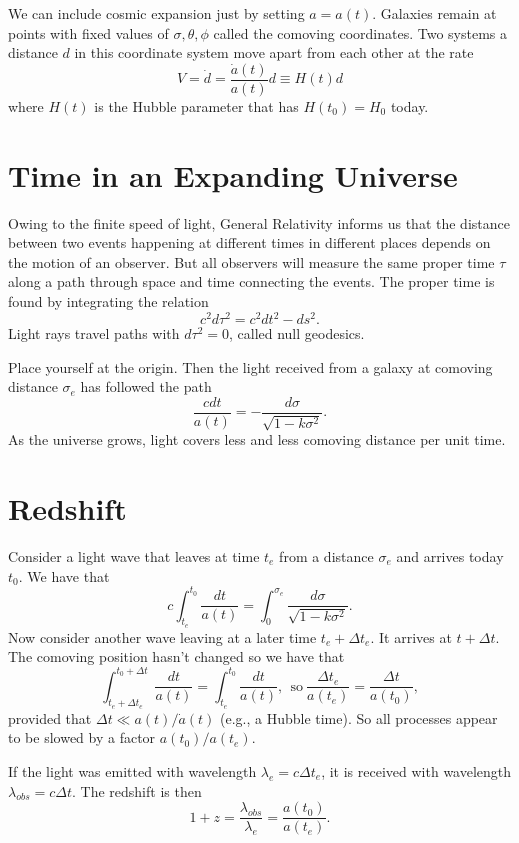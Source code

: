\documentclass[]{article}
\begin{document}
We can include cosmic expansion just by setting $a = a(t)$. Galaxies
remain at points with fixed values of $\sigma, \theta, \phi$ called
the comoving coordinates.  Two systems a distance $d$ in this coordinate system
move apart from each other at the rate
\begin{equation}
V = \dot{d} = \frac{\dot{a}(t)}{a(t)}d \equiv H(t) d
\end{equation}
\noindent
where $H(t)$ is the Hubble parameter that has $H(t_0) = H_0$
today.

\section{Time in an Expanding Universe}
Owing to the finite speed of light, General Relativity
informs us that the distance between two events happening
at different times in different places depends on  the
motion of an observer.  But all observers will measure
the same proper time $\tau$ along a path through space
and time connecting the events.  The proper time
is found by integrating the relation
\begin{equation}
c^2 d\tau^2 = c^2 dt^2 - ds^2.
\end{equation}
\noindent
Light rays travel paths with $d\tau^2 = 0$, called
null geodesics.

Place yourself at the origin.  Then the light
received from a galaxy at comoving distance
$\sigma_e$ has followed the path
\begin{equation}
\frac{c dt}{a(t)} = -\frac{d\sigma}{\sqrt{1-k\sigma^2}}.
\end{equation}
\noindent
As the universe grows, light covers less and less 
comoving distance per unit time.

\section{Redshift}

Consider a light wave that leaves at time $t_e$
from a distance $\sigma_e$ and arrives today $t_0$.
We have that
\begin{equation}
c\int_{t_e}^{t_0} \frac{dt}{a(t)} = \int_0^{\sigma_e} \frac{d\sigma}{\sqrt{1-k\sigma^2}}.
\end{equation}
\noindent
Now consider another wave leaving at a later time $t_e + \Delta t_e$.
It arrives at $t + \Delta t$.  The comoving position hasn't changed
so we have that
\begin{equation}
\int_{t_e+\Delta t_e}^{t_0 + \Delta t} \frac{dt}{a(t)} = \int_{t_e}^{t_0} \frac{dt}{a(t)},~~\mathrm{so}~\frac{\Delta t_e}{a(t_e)} = \frac{\Delta t}{a(t_0)},
\end{equation}
\noindent
provided that $\Delta t \ll a(t)/\dot{a}(t)$ (e.g., a Hubble time).  So all processes appear to be
slowed by a factor $a(t_0)/a(t_e)$.

If the light was emitted with wavelength $\lambda_e = c \Delta t_e$, it is
received with wavelength $\lambda_{obs} = c \Delta t$.  The
redshift is then
\begin{equation}
1 + z = \frac{\lambda_{obs}}{\lambda_e} = \frac{a(t_0)}{a(t_e)}.
\end{equation}
\end{document}
